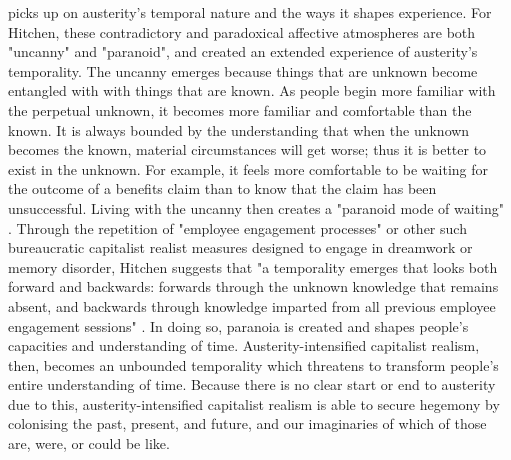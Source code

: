 \citet{hitchen_affective_2019} picks up on austerity's temporal nature and the ways it shapes experience. For Hitchen, these contradictory and paradoxical affective atmospheres are both "uncanny" and "paranoid", and created an extended experience of austerity's temporality. The uncanny emerges because things that are unknown become entangled with with things that are known. As people begin more familiar with the perpetual unknown, it becomes more familiar and comfortable than the known. It is always bounded by the understanding that when the unknown becomes the known, material circumstances will get worse; thus it is better to exist in the unknown. For example, it feels more comfortable to be waiting for the outcome of a benefits claim than to know that the claim has been unsuccessful. Living with the uncanny then  creates a "paranoid mode of waiting" \citep[p. 13]{hitchen_affective_2019}. Through the repetition of "employee engagement processes" or other such bureaucratic capitalist realist measures designed to engage in dreamwork or memory disorder, Hitchen suggests that "a temporality emerges that looks both forward and backwards: forwards through the unknown knowledge that remains absent, and backwards through knowledge imparted from all previous employee engagement sessions" \citep[p. 12]{hitchen_affective_2019}. In doing so, paranoia is created and shapes people's capacities and understanding of time. Austerity-intensified capitalist realism, then, becomes an unbounded temporality which threatens to transform people's entire understanding of time. Because there is no clear start or end to austerity due to this, austerity-intensified capitalist realism is able to secure hegemony by colonising the past, present, and future, and our imaginaries of which of those are, were, or could be like.

